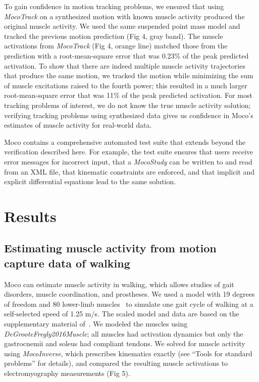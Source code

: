 \documentclass[10pt,letterpaper]{article}
\begin{document}
To gain confidence in motion tracking problems, we ensured that using \textit{MocoTrack} on a synthesized motion with known muscle activity produced the original muscle activity. We used the same suspended point mass model and tracked the previous motion prediction (Fig 4, gray band). The muscle activations from \textit{MocoTrack} (Fig 4, orange line) matched those from the prediction with a root-mean-square error that was 0.23\% of the peak predicted activation. To show that there are indeed multiple muscle activity trajectories that produce the same motion, we tracked the motion while minimizing the sum of muscle excitations raised to the fourth power; this resulted in a much larger root-mean-square error that was 11\% of the peak predicted activation. For most tracking problems of interest, we do not know the true muscle activity solution; verifying tracking problems using synthesized data gives us confidence in Moco’s estimates of muscle activity for real-world data.

Moco contains a comprehensive automated test suite that extends beyond the verification described here. For example, the test suite ensures that users receive error messages for incorrect input, that a \textit{MocoStudy} can be written to and read from an XML file, that kinematic constraints are enforced, and that implicit and explicit differential equations lead to the same solution.

\section*{Results}

\subsection*{Estimating muscle activity from motion capture data of walking}

Moco can estimate muscle activity in walking, which allows studies of gait disorders, muscle coordination, and prostheses. We used a model with 19 degrees of freedom and 80 lower-limb muscles~\cite{Rajagopal:2016ek} to simulate one gait cycle of walking at a self-selected speed of 1.25 m/s. The scaled model and data are based on the supplementary material of~\cite{Rajagopal:2016ek}. We modeled the muscles using \textit{DeGrooteFregly2016Muscle}; all muscles had activation dynamics but only the gastrocnemii and soleus had compliant tendons. We solved for muscle activity using \textit{MocoInverse}, which prescribes kinematics exactly (see “Tools for standard problems” for details), and compared the resulting muscle activations to electromyography measurements (Fig 5).
\end{document}
